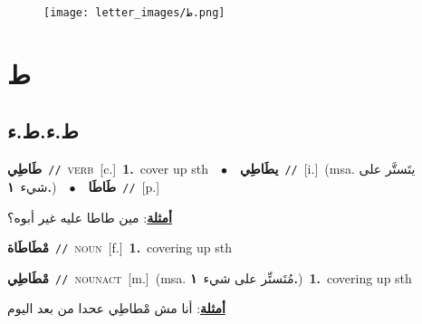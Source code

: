 \documentclass[10pt,a4paper,twoside]{article} %
\begin{document}
\begin{figure*}[t!]\centering\texttt{[image: letter\_images/ط.png]}\end{figure*}
\color{white}

 \section*{\foreignlanguage{arabic}{ط}} 
 \begin{multicols}{2} 

%
\color{black}
\vspace{-3mm}
\subsection*{\color{blue}\foreignlanguage{arabic}{ط.ء.ط.ء}\color{blue}{}} 

{\setlength\topsep{0pt}\textbf{\foreignlanguage{arabic}{طَاطِي}}\ {\color{gray}\texttt{//}\color{black}}\ \textsc{verb}\ [c.]\ \textbf{1.}~cover up sth\ \ $\bullet$\ \ \setlength\topsep{0pt}\textbf{\foreignlanguage{arabic}{يطَاطِي}}\ {\color{gray}\texttt{//}\color{black}}\ [i.]\ \color{gray}(msa. \foreignlanguage{arabic}{يتَستَّر على شيء}~\foreignlanguage{arabic}{\textbf{١.}})\color{black}\ \ $\bullet$\ \ \setlength\topsep{0pt}\textbf{\foreignlanguage{arabic}{طَاطَا}}\ {\color{gray}\texttt{//}\color{black}}\ [p.]\  \begin{flushright}\color{gray}\foreignlanguage{arabic}{\textbf{\underline{\foreignlanguage{arabic}{أمثلة}}}: مين طاطا عليه غير أبوه؟}\end{flushright}\color{black}} \vspace{2mm}

{\setlength\topsep{0pt}\textbf{\foreignlanguage{arabic}{مْطَاطَاة}}\ {\color{gray}\texttt{//}\color{black}}\ \textsc{noun}\ [f.]\ \textbf{1.}~covering up sth\ 

{\setlength\topsep{0pt}\textbf{\foreignlanguage{arabic}{مْطَاطِي}}\ {\color{gray}\texttt{//}\color{black}}\ \textsc{noun\textunderscore act}\ [m.]\ \color{gray}(msa. \foreignlanguage{arabic}{مُتَستِّر على شيء}~\foreignlanguage{arabic}{\textbf{١.}})\color{black}\ \textbf{1.}~covering up sth\  \begin{flushright}\color{gray}\foreignlanguage{arabic}{\textbf{\underline{\foreignlanguage{arabic}{أمثلة}}}: أنا مش مْطاطِي عحدا من بعد اليوم}\end{flushright}\color{black}} \vspace{2mm}

}
\end{multicols}
\end{document}
